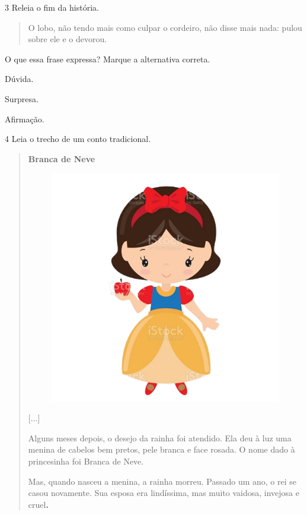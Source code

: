 \num{3} Releia o fim da história.

\begin{quote}
O lobo, não tendo mais como culpar o cordeiro, não disse mais nada:
pulou sobre ele e o devorou.
\end{quote}

O que essa frase expressa? Marque a alternativa correta.

\begin{boxlist}
 Dúvida.

 Surpresa.

 Afirmação.
\end{boxlist}

\num{4} Leia o trecho de um conto tradicional.



\enlargethispage{3\baselineskip}
\begin{quote}
\textbf{Branca de Neve}

\begin{figure}
\includegraphics[width=.5\textwidth]{./media/image6.png}
\end{figure}

{[}...{]}

Alguns meses depois, o desejo da rainha foi atendido. Ela deu à luz uma
menina de cabelos bem pretos, pele branca e face rosada. O nome dado à
princesinha foi Branca de Neve.

Mas, quando nasceu a menina, a rainha morreu. Passado um ano, o rei se
casou novamente. Sua esposa era lindíssima, mas muito vaidosa, invejosa
e cruel\textbf{.}
\end{quote}

